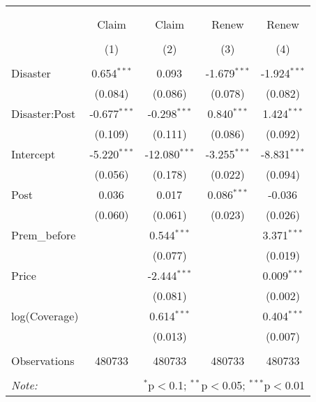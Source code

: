 
\begin{tabular}{@{\extracolsep{5pt}}lcccc}
\\[-1.8ex]\hline
\hline \\[-1.8ex]
\\[-1.8ex] & \multicolumn{1}{c}{Claim} & \multicolumn{1}{c}{Claim} & \multicolumn{1}{c}{Renew} & \multicolumn{1}{c}{Renew}  \\
\\[-1.8ex] & (1) & (2) & (3) & (4) \\
\hline \\[-1.8ex]
 Disaster & 0.654$^{***}$ & 0.093$^{}$ & -1.679$^{***}$ & -1.924$^{***}$ \\
& (0.084) & (0.086) & (0.078) & (0.082) \\
 Disaster:Post & -0.677$^{***}$ & -0.298$^{***}$ & 0.840$^{***}$ & 1.424$^{***}$ \\
& (0.109) & (0.111) & (0.086) & (0.092) \\
 Intercept & -5.220$^{***}$ & -12.080$^{***}$ & -3.255$^{***}$ & -8.831$^{***}$ \\
& (0.056) & (0.178) & (0.022) & (0.094) \\
 Post & 0.036$^{}$ & 0.017$^{}$ & 0.086$^{***}$ & -0.036$^{}$ \\
& (0.060) & (0.061) & (0.023) & (0.026) \\
 Prem\_before & & 0.544$^{***}$ & & 3.371$^{***}$ \\
& & (0.077) & & (0.019) \\
 Price & & -2.444$^{***}$ & & 0.009$^{***}$ \\
& & (0.081) & & (0.002) \\
 log(Coverage) & & 0.614$^{***}$ & & 0.404$^{***}$ \\
& & (0.013) & & (0.007) \\
\hline \\[-1.8ex]
 Observations & 480733 & 480733 & 480733 & 480733 \\
\hline
\hline \\[-1.8ex]
\textit{Note:} & \multicolumn{4}{r}{$^{*}$p$<$0.1; $^{**}$p$<$0.05; $^{***}$p$<$0.01} \\
\end{tabular}
